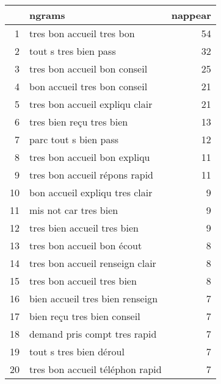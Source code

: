 \begin{tabular}{|r|l|r|}
  \hline
 & ngrams & nappear \\ 
  \hline
1 & tres bon accueil tres bon &  54 \\ 
  2 & tout s tres bien pass &  32 \\ 
  3 & tres bon accueil bon conseil &  25 \\ 
  4 & bon accueil tres bon conseil &  21 \\ 
  5 & tres bon accueil expliqu clair &  21 \\ 
  6 & tres bien reçu tres bien &  13 \\ 
  7 & parc tout s bien pass &  12 \\ 
  8 & tres bon accueil bon expliqu &  11 \\ 
  9 & tres bon accueil répons rapid &  11 \\ 
  10 & bon accueil expliqu tres clair &   9 \\ 
  11 & mis not car tres bien &   9 \\ 
  12 & tres bien accueil tres bien &   9 \\ 
  13 & tres bon accueil bon écout &   8 \\ 
  14 & tres bon accueil renseign clair &   8 \\ 
  15 & tres bon accueil tres bien &   8 \\ 
  16 & bien accueil tres bien renseign &   7 \\ 
  17 & bien reçu tres bien conseil &   7 \\ 
  18 & demand pris compt tres rapid &   7 \\ 
  19 & tout s tres bien déroul &   7 \\ 
  20 & tres bon accueil téléphon rapid &   7 \\ 
   \hline
\end{tabular}

